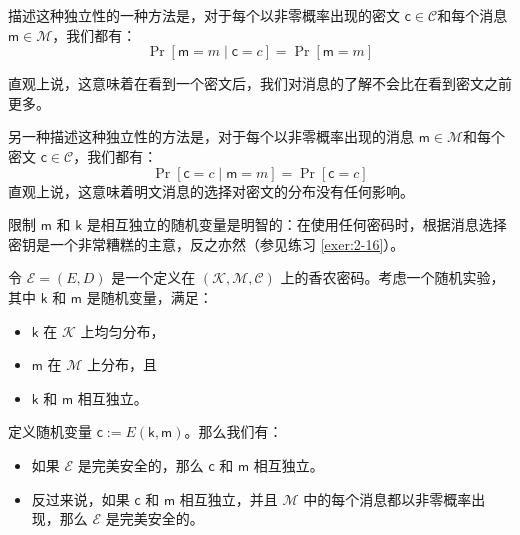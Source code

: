 描述这种独立性的一种方法是，对于每个以非零概率出现的密文 $\mathsf{c}\in\mathcal{C}$和每个消息 $\mathsf{m}\in\mathcal{M}$，我们都有：
\[
\Pr[\mathsf{m}=m\;|\;\mathsf{c}=c]=
\Pr[\mathsf{m}=m]
\]

直观上说，这意味着在看到一个密文后，我们对消息的了解不会比在看到密文之前更多。

另一种描述这种独立性的方法是，对于每个以非零概率出现的消息 $\mathsf{m}\in\mathcal{M}$和每个密文 $\mathsf{c}\in\mathcal{C}$，我们都有：
\[
\Pr[\mathsf{c}=c\;|\;\mathsf{m}=m]=
\Pr[\mathsf{c}=c]
\]
直观上说，这意味着明文消息的选择对密文的分布没有任何影响。

限制 $\mathsf{m}$ 和 $\mathsf{k}$ 是相互独立的随机变量是明智的：在使用任何密码时，根据消息选择密钥是一个非常糟糕的主意，反之亦然（参见练习 \ref{exer:2-16}）。

\begin{theorem}\label{theo:2-4}
令 $\mathcal{E}=(E,D)$ 是一个定义在 $(\mathcal{K},\mathcal{M},\mathcal{C})$ 上的香农密码。考虑一个随机实验，其中 $\mathsf{k}$ 和 $\mathsf{m}$ 是随机变量，满足：
\begin{itemize}
	\item $\mathsf{k}$ 在 $\mathcal{K}$ 上均匀分布，
	\item $\mathsf{m}$ 在 $\mathcal{M}$ 上分布，且
	\item $\mathsf{k}$ 和 $\mathsf{m}$ 相互独立。
\end{itemize}
定义随机变量 $\mathsf{c}:=E(\mathsf{k},\mathsf{m})$。那么我们有：
\begin{itemize}
	\item 如果 $\mathcal{E}$ 是完美安全的，那么 $\mathsf{c}$ 和 $\mathsf{m}$ 相互独立。
	\item 反过来说，如果 $\mathsf{c}$ 和 $\mathsf{m}$ 相互独立，并且 $\mathcal{M}$ 中的每个消息都以非零概率出现，那么 $\mathcal{E}$ 是完美安全的。
\end{itemize}
\end{theorem}

